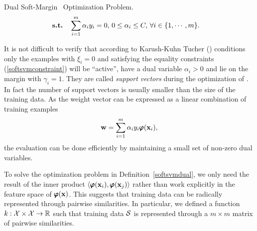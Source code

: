 {\begin{definition}{Dual Soft-Margin \svm\ Optimization Problem.}
\begin{align*}
		\textbf{s.t.} & \quad \sum_{i=1}^{m}\alpha_iy_i=0, \, 0\le\alpha_i\le C, \, \forall i\in\{1,\cdots,m\}.
	\end{align*}
\end{definition}
\noindent
It is not difficult to verify that according to Karush-Kuhn Tucher (\kkt) conditions only the examples with $\xi_i=0$ and satisfying the equality constraints (\ref{softsvmconstraint}) will be ``active'', have a dual variable $\alpha_i>0$ and lie on the margin with $\gamma_i=1$.
They are called \textit{support vectors} during the optimization of \svm.
In fact the number of support vectors is usually smaller than the size of the training data.
As the weight vector can be expressed as a linear combination of training examples \citep{Taylor04kernel}
\begin{align*}
	\mathbf {w} = \sum_{i=1}^{m}\alpha_iy_i\pmb \varphi(\mathbf {x}_i),
\end{align*}
the evaluation can be done efficiently by maintaining a small set of non-zero dual variables.

To solve the optimization problem in Definition~\ref{softsvmdual}, we only need the result of the inner product $\langle \pmb \varphi(\mathbf {x}_i), \pmb \varphi(\mathbf {x}_j) \rangle$ rather than work explicitly in the feature space of $\pmb \varphi(\mathbf {x})$.
This suggests that training data can be radically represented through pairwise similarities.
In particular, we defined a function $k:\mathcal{X}\times\mathcal{X}\rightarrow\mathbb{R}$ such that training data $\mathcal{S}$ is represented through a $m\times m$ matrix of pairwise similarities.

}
